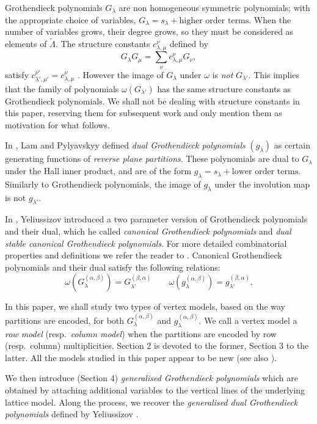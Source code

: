 \documentclass[ALCO, Unicode]{cedram}
\newcommand\g{{g^{(\alpha,\beta)}_{\lambda}}}
\newcommand\Gg{{G^{(\alpha,\beta)}_{\lambda}}}
\begin{document}
Grothendieck polynomials $G_\lambda$ are non homogeneous symmetric polynomials; with the
appropriate choice of variables, $G_\lambda=s_\lambda+\text{higher order terms}$. When the number of variables grows, their degree grows, so they must be considered as elements of $\tilde \Lambda$.
The structure constants $c^{\nu}_{\lambda,\mu}$ defined by
\[
G_{\lambda}G_{\mu}=\sum_{\nu}c^{\nu}_{\lambda,\mu}G_{\nu},
\]
 satisfy $c^{\nu'}_{\lambda',\mu'}=c^\nu_{\lambda,\mu}$ \cite[Ex.~9.20]{Ful-Young}. However the image of $G_{\lambda}$ under $\omega$ is {\em not} $G_{\lambda'}$. This implies that the family of polynomials $\omega(G_{\lambda'})$ has the same structure constants as Grothendieck polynomials. We shall not be dealing with structure constants in this paper, reserving them for subsequent work \cite{Vortex-honeycombs} and only mention them as motivation for what follows.

In  \cite{Lp-dualgroth}, Lam and Pylyavskyy defined \emph{dual Grothendieck polynomials} $(g_{\lambda})$ as certain generating functions of \emph{reverse plane partitions}. These polynomials are dual to $G_{\lambda}$ under the Hall inner product, and are of the form $g_\lambda=s_\lambda+\text{lower order terms}$. Similarly to Grothendieck polynomials, the image of $g_{\lambda}$ under the involution map is not $g_{\lambda'}$.

In \cite{canon-groth}, Yeliussizov introduced a two parameter version of Grothendieck polynomials and their dual, which he called \emph{canonical Grothendieck polynomials} and \emph{dual stable canonical  Grothendieck polynomials}. For more detailed combinatorial properties and definitions we refer the reader to \cite{canon-groth}. Canonical Grothendieck polynomials and their dual satisfy the following relations:
\[
\omega(\Gg)=G^{(\beta,\alpha)}_{\lambda'}\qquad  \omega(\g)=g^{(\beta,\alpha)}_{\lambda'}.
\]

In this paper, we shall study two types of vertex models, based on the way partitions are encoded, for both $\Gg$ and $\g$. We call a vertex model a \emph{row model} (resp.\ \emph{column model}) when the partitions are encoded by row (resp.\ column) multiplicities. Section 2 is devoted to the former, Section 3 to the latter. All the models studied in this paper appear to be new (see also \cite{Ms-bosfer-ktheory}).


We then introduce (Section 4) \emph{generalised Grothendieck  polynomials} %
which are obtained by attaching additional variables to the vertical lines of the underlying lattice model. Along the process, we recover the \emph{generalised dual Grothendieck polynomials} defined by Yeliussizov \cite{DY-dualcauchy}.
\end{document}
